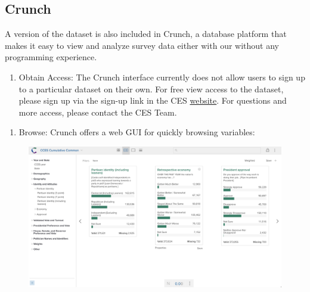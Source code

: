 \documentclass[10pt,article,oneside]{memoir}
\theoremstyle{definition}
\begin{document}
\hypertarget{crunch}{%
\subsection{Crunch}\label{crunch}}

A version of the dataset is also included in Crunch, a database platform
that makes it easy to view and analyze survey data either with our
without any programming experience.

\begin{enumerate}
\def\labelenumi{\arabic{enumi}.}
\tightlist
\item
  Obtain Access: The Crunch interface currently does not allow users to
  sign up to a particular dataset on their own. For free view access to
  the dataset, please sign up via the sign-up link in the CES
  \href{https://cces.gov.harvard.edu/explore}{website}. For questions
  and more access, please contact the CES Team.
\end{enumerate}

\newpage

\begin{enumerate}
\def\labelenumi{\arabic{enumi}.}
\setcounter{enumi}{1}
\tightlist
\item
  Browse: Crunch offers a web GUI for quickly browsing variables:
\end{enumerate}

\begin{figure}[H]
\centering
\centerline{\includegraphics[width=1.05\linewidth]{01_crunch_browse.png}}
\end{figure}
\end{document}
